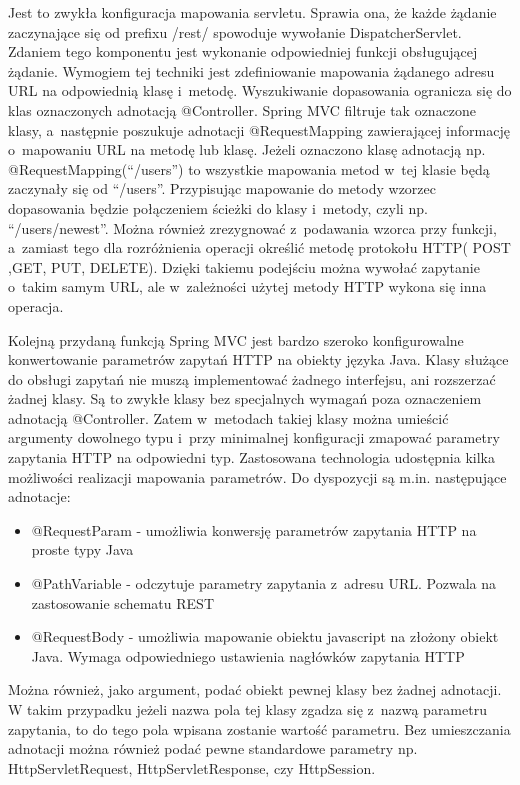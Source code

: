 Jest to zwykła konfiguracja mapowania servletu. Sprawia ona, że każde żądanie zaczynające się od prefixu /rest/ spowoduje wywołanie DispatcherServlet. Zdaniem tego komponentu jest wykonanie odpowiedniej funkcji obsługującej żądanie. Wymogiem tej techniki jest zdefiniowanie mapowania żądanego adresu URL na odpowiednią klasę i~metodę. Wyszukiwanie dopasowania ogranicza się do klas oznaczonych adnotacją @Controller. Spring MVC filtruje tak oznaczone klasy, a~następnie poszukuje adnotacji @RequestMapping zawierającej informację o~mapowaniu URL na metodę lub klasę. Jeżeli oznaczono klasę adnotacją np. @RequestMapping(“/users”) to wszystkie mapowania metod w~tej klasie będą zaczynały się od “/users”. Przypisując mapowanie do metody wzorzec dopasowania będzie połączeniem ścieżki do klasy i~metody, czyli np. “/users/newest”. Można również zrezygnować z~podawania wzorca przy funkcji, a~zamiast tego dla rozróżnienia operacji określić metodę protokołu HTTP( POST ,GET, PUT, DELETE). Dzięki takiemu podejściu można wywołać zapytanie o~takim samym URL, ale w~zależności użytej metody HTTP wykona się inna operacja. 

Kolejną przydaną funkcją Spring MVC jest bardzo szeroko konfigurowalne konwertowanie parametrów zapytań HTTP na obiekty języka Java. Klasy służące do obsługi zapytań nie muszą implementować żadnego interfejsu, ani rozszerzać żadnej klasy. Są to zwykłe klasy bez specjalnych wymagań poza oznaczeniem adnotacją @Controller. Zatem w~metodach takiej klasy można umieścić argumenty dowolnego typu i~przy minimalnej konfiguracji zmapować parametry zapytania HTTP na odpowiedni typ. Zastosowana technologia udostępnia kilka możliwości realizacji mapowania parametrów. Do dyspozycji są m.in. następujące adnotacje:

\begin{itemize}
\item @RequestParam - umożliwia konwersję parametrów zapytania HTTP na proste typy Java
\item @PathVariable - odczytuje parametry zapytania z~adresu URL. Pozwala na zastosowanie schematu REST 
\item @RequestBody - umożliwia mapowanie obiektu javascript na złożony obiekt Java. Wymaga odpowiedniego ustawienia nagłówków zapytania HTTP
\end{itemize}

Można również, jako argument, podać obiekt pewnej klasy bez żadnej adnotacji. W takim przypadku jeżeli nazwa pola tej klasy zgadza się z~nazwą parametru zapytania, to do tego pola wpisana zostanie wartość parametru. Bez umieszczania adnotacji można również podać pewne standardowe parametry np. HttpServletRequest, HttpServletResponse, czy HttpSession\cite{springmvcWww}.

